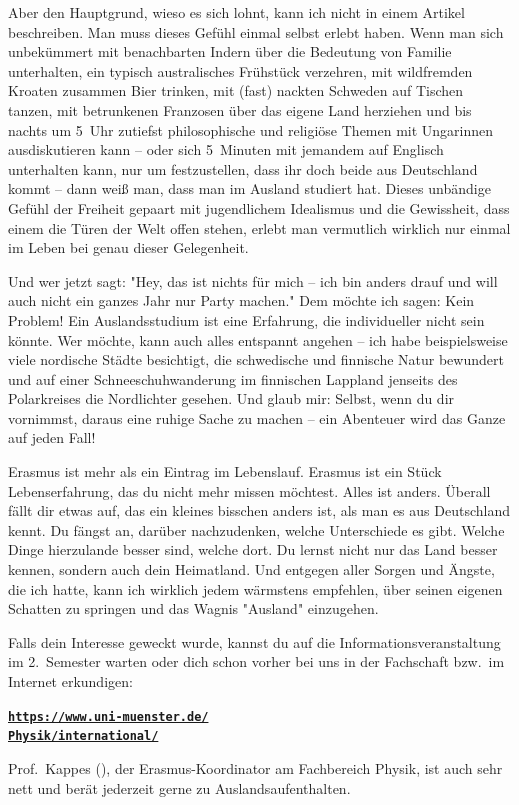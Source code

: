 \begin{multicols}{2}
Aber den Hauptgrund, wieso es sich lohnt, kann ich nicht in einem Artikel beschreiben.
Man muss dieses Gefühl einmal selbst erlebt haben.
Wenn man sich unbekümmert mit benachbarten Indern über die Bedeutung von Familie unterhalten, ein typisch australisches Frühstück verzehren, mit wildfremden Kroaten zusammen Bier trinken, mit (fast) nackten Schweden auf Tischen tanzen, mit betrunkenen Franzosen über das eigene Land herziehen und bis nachts um 5~Uhr zutiefst philosophische und religiöse Themen mit Ungarinnen ausdiskutieren kann – oder sich 5~Minuten mit jemandem auf Englisch unterhalten kann, nur um festzustellen, dass ihr doch beide aus Deutschland kommt – dann weiß man, dass man im Ausland studiert hat.
Dieses unbändige Gefühl der Freiheit gepaart mit jugendlichem Idealismus und die Gewissheit, dass einem die Türen der Welt offen stehen, erlebt man vermutlich wirklich nur einmal im Leben bei genau dieser Gelegenheit.

Und wer jetzt sagt:
"Hey, das ist nichts für mich – ich bin anders drauf und will auch nicht ein ganzes Jahr nur Party machen."
Dem möchte ich sagen: Kein Problem!
Ein Auslandsstudium ist eine Erfahrung, die individueller nicht sein könnte.
Wer möchte, kann auch alles entspannt angehen – ich habe beispielsweise viele nordische Städte besichtigt, die schwedische und finnische Natur bewundert und auf einer Schneeschuhwanderung im finnischen Lappland jenseits des Polarkreises die Nordlichter gesehen.
Und glaub mir: Selbst, wenn du dir vornimmst, daraus eine ruhige Sache zu machen – ein Abenteuer wird das Ganze auf jeden Fall!

Erasmus ist mehr als ein Eintrag im Lebenslauf.
Erasmus ist ein Stück Lebenserfahrung, das du nicht mehr missen möchtest.
Alles ist anders.
Überall fällt dir etwas auf, das ein kleines bisschen anders ist, als man es aus Deutschland kennt.
Du fängst an, darüber nachzudenken, welche Unterschiede es gibt.
Welche Dinge hierzulande besser sind, welche dort.
Du lernst nicht nur das Land besser kennen, sondern auch dein Heimatland.
Und entgegen aller Sorgen und Ängste, die ich hatte, kann ich wirklich jedem wärmstens empfehlen, über seinen eigenen Schatten zu springen und das Wagnis "Ausland" einzugehen.

Falls dein Interesse geweckt wurde, kannst du auf die Informationsveranstaltung im 2.~Semester warten oder dich schon vorher bei uns in der Fachschaft bzw.\ im Internet erkundigen:
\begin{center}
	\href{https://www.uni-muenster.de/Physik/international/}{\textbf{\texttt{https://www.uni-muenster.de/\\Physik/international/}}}
\end{center}

Prof.~Kappes (), der Erasmus-Koordinator am Fachbereich Physik, ist auch sehr nett und berät jederzeit gerne zu Auslandsaufenthalten.

\end{multicols}

